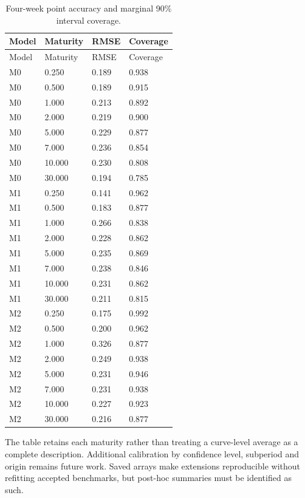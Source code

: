 \documentclass[
  12pt,
  letterpaper,
  DIV=11,
  numbers=noendperiod]{scrreprt}
\begin{document}
\begin{longtable}[]{@{}llll@{}}
\caption{Four-week point accuracy and marginal 90\% interval
coverage.}\label{tbl-maturity}\tabularnewline
\toprule\noalign{}
Model & Maturity & RMSE & Coverage \\
\midrule\noalign{}
\endfirsthead
\toprule\noalign{}
Model & Maturity & RMSE & Coverage \\
\midrule\noalign{}
\endhead
\bottomrule\noalign{}
\endlastfoot
M0 & 0.250 & 0.189 & 0.938 \\
M0 & 0.500 & 0.189 & 0.915 \\
M0 & 1.000 & 0.213 & 0.892 \\
M0 & 2.000 & 0.219 & 0.900 \\
M0 & 5.000 & 0.229 & 0.877 \\
M0 & 7.000 & 0.236 & 0.854 \\
M0 & 10.000 & 0.230 & 0.808 \\
M0 & 30.000 & 0.194 & 0.785 \\
M1 & 0.250 & 0.141 & 0.962 \\
M1 & 0.500 & 0.183 & 0.877 \\
M1 & 1.000 & 0.266 & 0.838 \\
M1 & 2.000 & 0.228 & 0.862 \\
M1 & 5.000 & 0.235 & 0.869 \\
M1 & 7.000 & 0.238 & 0.846 \\
M1 & 10.000 & 0.231 & 0.862 \\
M1 & 30.000 & 0.211 & 0.815 \\
M2 & 0.250 & 0.175 & 0.992 \\
M2 & 0.500 & 0.200 & 0.962 \\
M2 & 1.000 & 0.326 & 0.877 \\
M2 & 2.000 & 0.249 & 0.938 \\
M2 & 5.000 & 0.231 & 0.946 \\
M2 & 7.000 & 0.231 & 0.938 \\
M2 & 10.000 & 0.227 & 0.923 \\
M2 & 30.000 & 0.216 & 0.877 \\
\end{longtable}

The table retains each maturity rather than treating a curve-level
average as a complete description. Additional calibration by confidence
level, subperiod and origin remains future work. Saved arrays make
extensions reproducible without refitting accepted benchmarks, but
post-hoc summaries must be identified as such.
\end{document}
